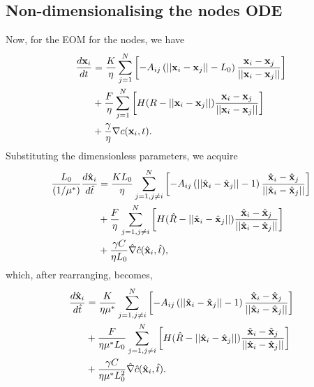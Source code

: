 \subsection{Non-dimensionalising the nodes ODE}
Now, for the EOM for the nodes, we have
\begin{equation*}
    \begin{split}
        \frac{d \vb{x}_i}{dt} &= 
        \frac{K}{ \eta}\sum_{j = 1}^N   \left[ - A_{ij} \left( ||\vb{x}_i - \vb{x}_j|| - L_0\right) \frac{\vb{x}_i - \vb{x}_j}{||\vb{x}_i - \vb{x}_j||} \right]\\
         &+ \frac{F}{ \eta}\sum_{j = 1}^N \left[ H(R - ||\vb{x}_i - \vb{x}_j||) \frac{\vb{x}_i - \vb{x}_j}{||\vb{x}_i - \vb{x}_j||}     \right]\\ 
         &+ \frac{\gamma}{\eta} \nabla c (\vb{x}_i, t).
    \end{split}
\end{equation*}
Substituting the dimensionless parameters, we acquire
\begin{equation*}
    \begin{split}
        \frac{L_0}{(1/\mu^*)}\frac{d \hat{\vb{x}}_i}{d \hat{t}} &= 
        \frac{K L_0}{ \eta}\sum_{j = 1, j \neq i}^N   \left[ - A_{ij}\left( ||\hat{\vb{x}}_i - \hat{\vb{x}}_j|| -  1\right) \frac{\hat{\vb{x}}_i - \hat{\vb{x}}_j}{||\hat{\vb{x}}_i - \hat{\vb{x}}_j||} \right]\\
         &+ \frac{F}{  \eta}\sum_{j = 1, j \neq i}^N \left[H(\hat{R} - ||\hat{\vb{x}}_i - \hat{\vb{x}}_j||) \frac{\hat{\vb{x}}_i - \hat{\vb{x}}_j}{||\hat{\vb{x}}_i - \hat{\vb{x}}_j||}     \right]\\ 
         &+ \frac{\gamma C}{ \eta L_0} \hat{\nabla}  \hat{c} (\hat{\vb{x}}_i, \hat{t}),
    \end{split}
\end{equation*}
which, after rearranging, becomes,
\begin{equation*}
    \begin{split}
        \frac{d \hat{\vb{x}}_i}{d \hat{t}} &= 
        \frac{K}{ \eta \mu^*}\sum_{j = 1, j \neq i}^N   \left[ - A_{ij}\left( ||\hat{\vb{x}}_i - \hat{\vb{x}}_j|| -  1\right) \frac{\hat{\vb{x}}_i - \hat{\vb{x}}_j}{||\hat{\vb{x}}_i - \hat{\vb{x}}_j||} \right]\\
         &+ \frac{F}{  \eta \mu^* L_0}\sum_{j = 1, j \neq i}^N \left[H(\hat{R} - ||\hat{\vb{x}}_i - \hat{\vb{x}}_j||) \frac{\hat{\vb{x}}_i - \hat{\vb{x}}_j}{||\hat{\vb{x}}_i - \hat{\vb{x}}_j||}     \right]\\ 
         &+ \frac{\gamma C}{ \eta \mu^* L_0^2} \hat{\nabla}  \hat{c} (\hat{\vb{x}}_i, \hat{t}).
    \end{split}
\end{equation*}
